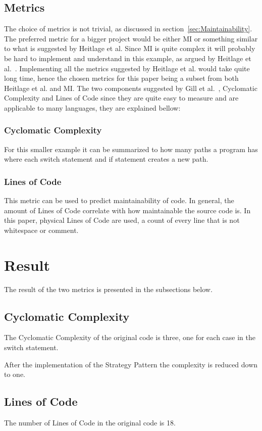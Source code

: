 \documentclass[conference, a4paper]{IEEEtran}
\begin{document}
\subsection{Metrics}
The choice of metrics is not trivial, as discussed in section~\ref{sec:Maintainability}. The preferred metric for a bigger project would be either MI or something similar to what is suggested by Heitlage et al. Since MI is quite complex it will probably be hard to implement and understand in this example, as argued by Heitlage et al.~\cite{bibitem:Maintainability}. Implementing all the metrics suggested by Heitlage et al. would take quite long time, hence the chosen metrics for this paper being a subset from both Heitlage et al. and MI. The two components suggested by Gill et al.~\cite{bibitem:CCD}, Cyclomatic Complexity and Lines of Code since they are quite easy to measure and are applicable to many languages, they are explained bellow:

\subsubsection{Cyclomatic Complexity}
For this smaller example it can be summarized to how many paths a program has where each switch statement and if statement creates a new path.

\subsubsection{Lines of Code}
This metric can be used to predict maintainability of code. In general, the amount of Lines of Code correlate with how maintainable the source code is. In this paper, physical Lines of Code are used, a count of every line that is not whitespace or comment.

\section{Result}
The result of the two metrics is presented in the subsections below.

\subsection{Cyclomatic Complexity}
The Cyclomatic Complexity of the original code is three, one for each case in the switch statement.

After the implementation of the Strategy Pattern the complexity is reduced down to one.

\subsection{Lines of Code}
The number of Lines of Code in the original code is 18.
\end{document}
